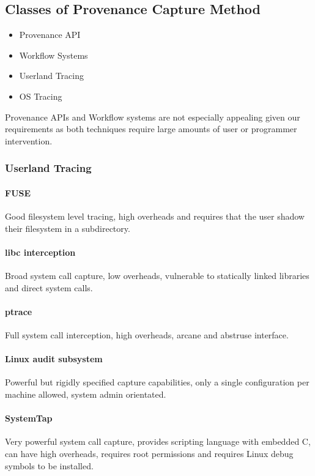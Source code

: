 \subsection{Classes of Provenance Capture Method}
\begin{itemize}
\item Provenance API
\item Workflow Systems
\item Userland Tracing
\item OS Tracing
\end{itemize}

Provenance APIs and Workflow systems are not especially appealing given our requirements as both techniques require large amounts of user or programmer intervention.

\subsubsection{Userland Tracing}
\paragraph{FUSE}
Good filesystem level tracing, high overheads and requires that the user shadow their filesystem in a subdirectory.
\paragraph{libc interception}
Broad system call capture, low overheads, vulnerable to statically linked libraries and direct system calls.
\paragraph{ptrace}
Full system call interception, high overheads, arcane and abstruse interface.
\paragraph{Linux audit subsystem}
Powerful but rigidly specified capture capabilities, only a single configuration per machine allowed, system admin orientated. 
\paragraph{SystemTap}
Very powerful system call capture, provides scripting language with embedded C, can have high overheads, requires root permissions and requires Linux debug symbols to be installed.

